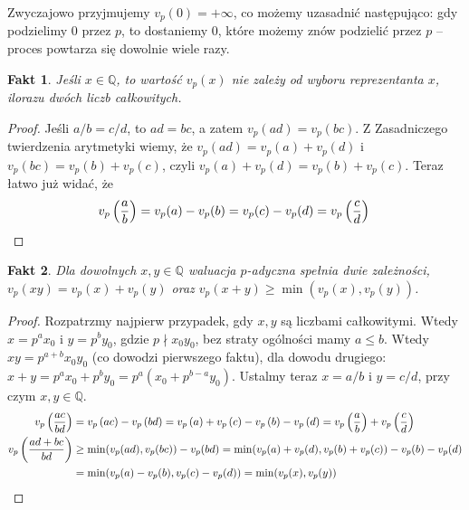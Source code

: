 \documentclass[a4paper,fleqn,9pt]{extarticle}
\newtheorem{fkt}{Fakt}
\begin{document}
Zwyczajowo przyjmujemy $v_p(0) = +\infty$, co możemy uzasadnić następująco: gdy podzielimy $0$ przez $p$, to dostaniemy $0$, które możemy znów podzielić przez $p$ -- proces powtarza się dowolnie wiele razy.

\begin{fkt}
Jeśli $x\in\mathbb Q$, to wartość $v_p(x)$ nie zależy od wyboru reprezentanta $x$, ilorazu dwóch liczb całkowitych.
\end{fkt}

\begin{proof}
Jeśli $a/b = c/d$, to $ad = bc$, a zatem $v_p(ad) = v_p(bc)$. Z Zasadniczego twierdzenia arytmetyki wiemy, że $v_p(ad) = v_p(a) + v_p(d)$ i $v_p(bc)= v_p(b) + v_p(c)$, czyli $v_p(a) + v_p(d) = v_p(b) + v_p(c)$. Teraz łatwo już widać, że 
\begin{equation*}
v_p\left(\frac{a}{b}\right)
 = v_p(a)-v_p(b)
 = v_p(c) - v_p(d)
 = v_p\left(\frac{c}{d}\right)\qedhere
\end{equation*}
\end{proof}


\begin{fkt}
Dla dowolnych $x,y \in \mathbb Q$ waluacja $p$-adyczna spełnia dwie zależności, $v_p(xy) = v_p(x) + v_p(y)$ oraz $v_p(x+y) \ge \min(v_p(x), v_p(y))$.
\end{fkt}

\begin{proof}
Rozpatrzmy najpierw przypadek, gdy $x,y$ są liczbami całkowitymi. 
Wtedy $x = p^ax_0$ i $y=p^by_0$, gdzie $p\nmid x_0y_0$, bez straty ogólności mamy $a\le b$.
Wtedy $xy=p^{a+b}x_0y_0$ (co dowodzi pierwszego faktu), dla dowodu drugiego: $x+y=p^ax_0+p^by_0 = p^a\left(x_0+p^{b-a}y_0\right)$. 
Ustalmy teraz $x=a/b$ i $y=c/d$, przy czym $x,y\in\mathbb Q$.
\begin{align*}
v_p\left(\frac{ac}{bd}\right) &
 = v_p\left(ac\right) - v_p\left(bd\right)
 = v_p\left(a\right) + v_p\left(c\right) - v_p\left(b\right) - v_p\left(d\right)
 = v_p\left(\frac{a}{b}\right) + v_p\left(\frac{c}{d}\right) \\
v_p\left(\frac{ad+bc}{bd}\right) &
\ge \min(v_p(ad), v_p(bc)) - v_p(bd)
  = \min(v_p(a) + v_p(d), v_p(b) + v_p(c)) - v_p(b) -v_p(d) \\ &
  = \min(v_p(a) - v_p(b), v_p(c) - v_p(d))
  = \min(v_p(x), v_p(y)) \qedhere
\end{align*}
\end{proof}
\end{document}
